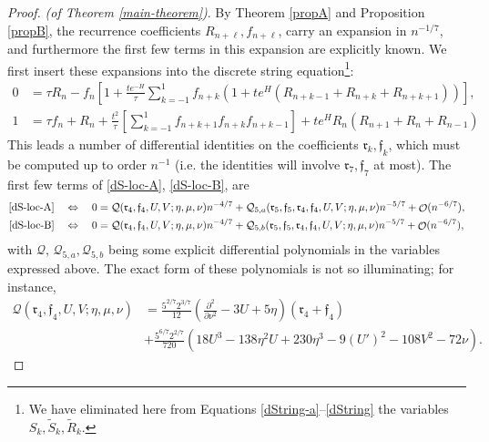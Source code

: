 \documentclass[usenames,dvipsnames]{article}
\theoremstyle{definition}
\DeclareMathOperator{\OO}{\mathcal{O}}
\numberwithin{equation}{section}
\numberwithin{figure}{section}
\begin{document}
\begin{proof}
    \textit{(of Theorem \ref{main-theorem})}.
        By Theorem \ref{propA} and Proposition \ref{propB}, the recurrence coefficients $R_{n+\ell}, f_{n+\ell}$, carry an expansion in $n^{-1/7}$, and 
        furthermore the first few terms in this expansion are explicitly known. We first insert these expansions into the discrete string equation\footnote{We have eliminated here from Equations \eqref{dString-a}--\eqref{dString} the variables $S_k,\tilde{S}_k,\tilde{R}_k$.}: 
            \begin{align}
                0 &= \tau R_n - f_n\left[1 + \frac{te^{-H}}{\tau}\sum_{k=-1}^{1}f_{n+k}\left(1+te^H(R_{n+k-1}+R_{n+k}+R_{n+k+1})\right)\right],\label{dS-loc-A}\\
                1 &= \tau f_n + R_n + \frac{t^2}{\tau}\left[\sum_{k=-1}^{1}f_{n+k+1}f_{n+k}f_{n+k-1}\right] + te^HR_n(R_{n+1}+R_n+R_{n-1})\label{dS-loc-B}
            \end{align}
        This leads a number of differential identities on the coefficients $\mathfrak{r}_k,\mathfrak{f}_k$, which must be computed up to order $n^{-1}$ (i.e. the identities will involve $\mathfrak{r}_7,\mathfrak{f}_7$ at most). The first few terms of \eqref{dS-loc-A}, 
        \eqref{dS-loc-B}, are
            \begin{align*}
                \eqref{dS-loc-A}\quad \Leftrightarrow \quad 0 &=\mathcal{Q}(\mathfrak{r}_4,\mathfrak{f}_4,U,V;\eta,\mu,\nu)n^{-4/7} + \mathcal{Q}_{5,a}(\mathfrak{r}_5,\mathfrak{f}_5,\mathfrak{r}_4,\mathfrak{f}_4,U,V;\eta,\mu,\nu)n^{-5/7} + \OO(n^{-6/7}),\\
                \eqref{dS-loc-B}\quad \Leftrightarrow \quad 0 &=\mathcal{Q}(\mathfrak{r}_4,\mathfrak{f}_4,U,V;\eta,\mu,\nu)n^{-4/7} + \mathcal{Q}_{5,b}(\mathfrak{r}_5,\mathfrak{f}_5,\mathfrak{r}_4,\mathfrak{f}_4,U,V;\eta,\mu,\nu)n^{-5/7} + \OO(n^{-6/7}),
            \end{align*}
            with $\mathcal{Q}$, $\mathcal{Q}_{5,a},\mathcal{Q}_{5,b}$ being some explicit differential polynomials in the variables expressed above.
            The exact form of these polynomials is not so illuminating; for instance, 
            \begin{align*}
                \mathcal{Q}(\mathfrak{r}_4,\mathfrak{f}_4,U,V;\eta,\mu,\nu) &= \frac{5^{2/7}2^{3/7}}{12}\left(\frac{\partial^2}{\partial \nu^2} -3U+5\eta\right)(\mathfrak{r}_4+\mathfrak{f}_4)\\
                &+ \frac{5^{6/7}2^{2/7}}{720}\left(18U^3-138\eta^2U+230\eta^3-9(U')^2-108V^2-72\nu\right).

\end{align*}
\end{proof}
\end{document}
